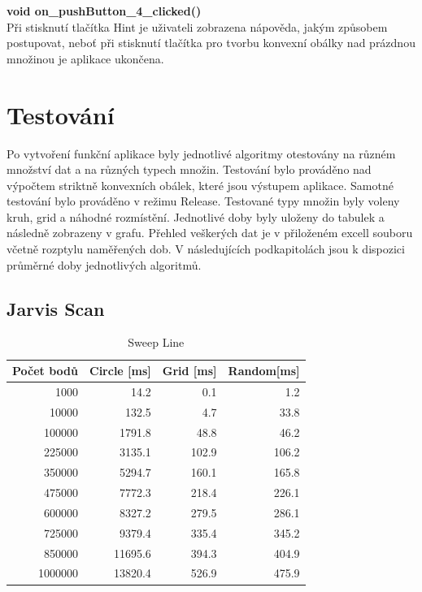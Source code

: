 \documentclass[a4paper, 12pt]{article}
\begin{document}
\textbf{void on\_pushButton\_4\_clicked()}\\
Při stisknutí tlačítka Hint je uživateli zobrazena nápověda, jakým způsobem postupovat, neboť při stisknutí tlačítka pro tvorbu konvexní obálky nad prázdnou množinou je aplikace ukončena.
\\


\section{Testování}
Po vytvoření funkční aplikace byly jednotlivé algoritmy otestovány na různém množství dat a na různých typech množin. Testování bylo prováděno nad výpočtem striktně konvexních obálek, které jsou výstupem aplikace. Samotné testování bylo prováděno v režimu Release. Testované typy množin byly voleny kruh, grid a náhodné rozmístění. Jednotlivé doby byly uloženy do tabulek a následně zobrazeny v grafu. Přehled veškerých dat je v přiloženém excell souboru včetně rozptylu naměřených dob. V následujících podkapitolách jsou k dispozici průměrné doby jednotlivých algoritmů.

\clearpage
\subsection{Jarvis Scan}


\begin{table}[h!]
	\centering
	\begin{tabular}{|r|r|r|r|}
	\hline
	 \textbf{Počet bodů} 	& \textbf{Circle [ms]} & \textbf{Grid [ms]}  & \textbf{Random[ms]} \\ \hline
	 1000 & 14.2 & 0.1 & 1.2   \\ \hline
	10000 & 132.5 & 4.7 & 33.8   \\ \hline
	100000 & 1791.8 & 48.8 & 46.2  \\ \hline
	225000 & 3135.1 & 102.9 & 106.2   \\ \hline
	350000 & 5294.7 & 160.1 & 165.8 \\ \hline
	475000 & 7772.3 & 218.4 & 226.1  \\ \hline
	600000 & 8327.2 & 279.5 & 286.1   \\ \hline
	725000 & 9379.4 & 335.4 & 345.2  \\ \hline
	850000 & 11695.6 & 394.3 & 404.9  \\ \hline
	1000000 & 13820.4 & 526.9 & 475.9  \\ \hline
	
	\end{tabular}
		\caption{Sweep Line}
\end{table}
\end{document}
